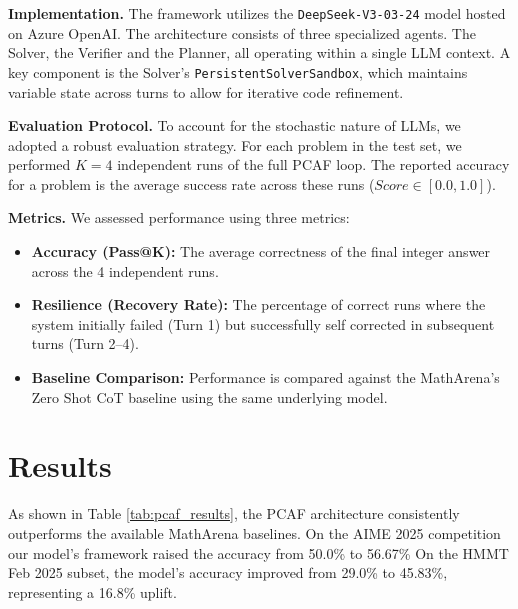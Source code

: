\documentclass{article}
\begin{document}
\textbf{Implementation.} The framework utilizes the \texttt{DeepSeek-V3-03-24} model hosted on Azure OpenAI. The architecture consists of three specialized agents. The Solver, the Verifier and the Planner, all operating within a single LLM context. A key component is the Solver's \texttt{PersistentSolverSandbox}, which maintains variable state across turns to allow for iterative code refinement.

\textbf{Evaluation Protocol.} To account for the stochastic nature of LLMs, we adopted a robust evaluation strategy. For each problem in the test set, we performed $K=4$ independent runs of the full PCAF loop. The reported accuracy for a problem is the average success rate across these runs ($Score \in [0.0, 1.0]$).

\textbf{Metrics.} We assessed performance using three metrics:
\begin{itemize}
    \item \textbf{Accuracy (Pass@K):} The average correctness of the final integer answer across the 4 independent runs.
    \item \textbf{Resilience (Recovery Rate):} The percentage of correct runs where the system initially failed (Turn 1) but successfully self corrected in subsequent turns (Turn 2--4).
    \item \textbf{Baseline Comparison:} Performance is compared against the MathArena's Zero Shot CoT baseline using the same underlying model.
\end{itemize}

\section{Results}
\label{sec:results}

As shown in Table \ref{tab:pcaf_results}, the PCAF architecture consistently outperforms the available MathArena baselines.
On the AIME 2025 competition our model's framework raised the accuracy from 50.0\% to 56.67\%
On the HMMT Feb 2025 subset, the model's accuracy improved from 29.0\% to 45.83\%, representing a 16.8\% uplift. 
\end{document}
